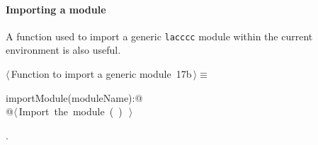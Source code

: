 \documentclass[11pt,oneside]{article}	%
\begin{document}
\paragraph{Importing a module} A function used to import a generic \texttt{lacccc} module within the current environment is also useful.
\begin{flushleft} \small
\begin{minipage}{\linewidth} \label{scrap32}
\protect{}$\langle\,$Function to import a generic module\nobreak\ {\footnotesize 17b}$\,\rangle\equiv$
\vspace{-1ex}
\begin{list}{}{} \item
\mbox{}\verb@def importModule(moduleName):@\\
\mbox{}\verb@   @\hbox{$\langle\,$Import the module\nobreak\ ({\footnotesize {}\label{scrap33}
 }\mbox{}\verb@moduleName@ ) {\footnotesize {}}$\,\rangle$}\verb@@\\
\mbox{}\verb@@{\NWsep}
\end{list}
\vspace{-1ex}
\footnotesize\addtolength{\baselineskip}{-1ex}
\begin{list}{}{\setlength{\itemsep}{-\parsep}\setlength{\itemindent}{-\leftmargin}}
\item {\NWtxtMacroNoRef}.
\end{list}
\end{minipage}\\[4ex]
\end{flushleft}




\end{document}
